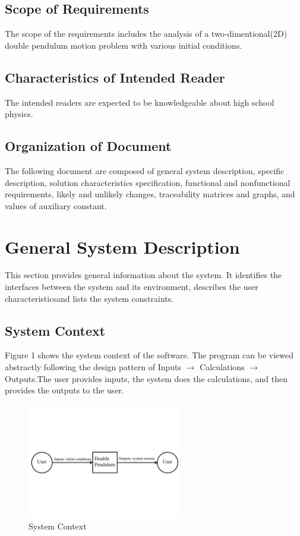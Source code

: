 \documentclass[12pt]{article}
\begin{document}
\subsection{Scope of Requirements}\label{sec_scope}
The scope of the requirements includes the analysis of a two-dimentional(2D) double pendulum motion problem with various initial conditions. 

\subsection{Characteristics of Intended Reader}\label{sec_intendedreader}
The intended readers are expected to be knowledgeable about high school physics. 

\subsection{Organization of Document}\label{sec_organization}
The following document are composed of general system description, specific description, solution characteristics specification, functional and nonfunctional requirements, likely and unlikely changes, traceability matrices and graphs, and values of auxiliary constant.


\section{General System Description}\label{sec_generalsystem}
This section provides general information about the system. It identifies the interfaces between the system and its environment, describes the user characteristicsand lists the system constraints. 

\subsection{System Context}\label{sec_syscontext}
Figure 1 shows the system context of the software. The program can be viewed abstractly following the design pattern of Inputs $\rightarrow$ Calculations $\rightarrow$ Outputs.The user provides inputs, the system does the calculations, and then provides the outputs to the user.
\begin{figure}[h!]
\begin{center}
 \includegraphics[width=0.6\textwidth]{SystemContextFigure}
\caption{System Context}
\label{Fig_SystemContext} 
\end{center}
\end{figure}
\end{document}
